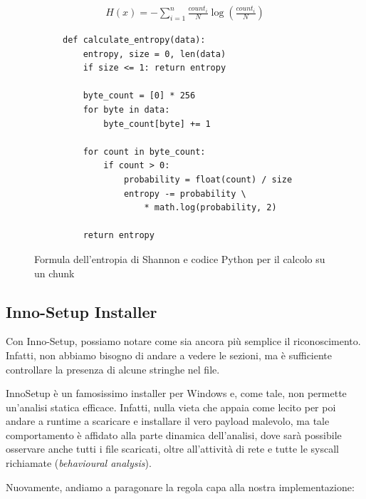 \begin{figure}[htbp]
    \begin{subfigure}[t]{0,48\textwidth}
        \begin{gather*}
            H(x) = - \sum_{i=1}^{n} \frac{count_i}{N} \log{\left(\frac{count_i}{N}\right)}
        \end{gather*}
    \end{subfigure}
    \begin{subfigure}[t]{0,48\textwidth}
        \begin{verbatim}
def calculate_entropy(data):
    entropy, size = 0, len(data)
    if size <= 1: return entropy

    byte_count = [0] * 256
    for byte in data:
        byte_count[byte] += 1

    for count in byte_count:
        if count > 0:
            probability = float(count) / size
            entropy -= probability \
                * math.log(probability, 2)

    return entropy
        \end{verbatim}
    \end{subfigure}
    \caption{Formula dell'entropia di Shannon e codice Python per il calcolo su un chunk}
    \label{fig:shannon_entropy_formula}
\end{figure}


\subsection{Inno-Setup Installer}
Con Inno-Setup, possiamo notare come sia ancora più semplice il riconoscimento. Infatti, non abbiamo bisogno di andare a vedere le sezioni, ma è sufficiente controllare la presenza di alcune stringhe nel file.

InnoSetup è un famosissimo installer per Windows e, come tale, non permette un'analisi statica
efficace. Infatti, nulla vieta che appaia come lecito per poi andare a runtime a scaricare e installare il vero payload malevolo, ma tale comportamento è affidato alla parte dinamica dell'analisi, dove sarà possibile osservare anche tutti i file scaricati, oltre all'attività di rete e tutte le syscall richiamate (\emph{behavioural analysis}).

Nuovamente, andiamo a paragonare la regola capa alla nostra implementazione:

